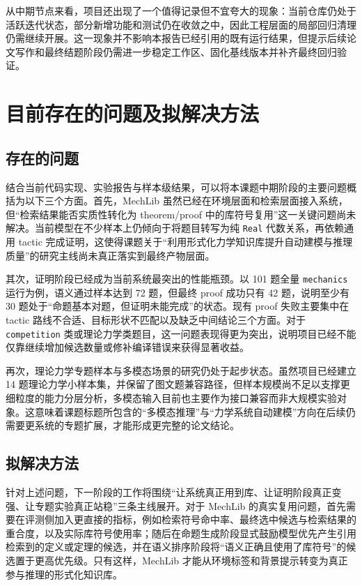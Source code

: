 \documentclass[12pt,a4paper]{ctexart}
\begin{document}
从中期节点来看，项目还出现了一个值得记录但不宜夸大的现象：当前仓库仍处于活跃迭代状态，部分新增功能和测试仍在收敛之中，因此工程层面的局部回归清理仍需继续开展。这一现象并不影响本报告已经引用的既有运行结果，但提示后续论文写作和最终结题阶段仍需进一步稳定工作区、固化基线版本并补齐最终回归验证。

\section{目前存在的问题及拟解决方法}

\subsection{存在的问题}

结合当前代码实现、实验报告与样本级结果，可以将本课题中期阶段的主要问题概括为以下三个方面。首先，MechLib 虽然已经在环境层面和检索层面接入系统，但“检索结果能否实质性转化为 theorem/proof 中的库符号复用”这一关键问题尚未解决。当前模型在不少样本上仍倾向于将题目转写为纯 \texttt{Real} 代数关系，再依赖通用 tactic 完成证明，这使得课题关于“利用形式化力学知识库提升自动建模与推理质量”的研究主线尚未真正落实到最终产物层面。

其次，证明阶段已经成为当前系统最突出的性能瓶颈。以 101 题全量 \texttt{mechanics} 运行为例，语义通过样本达到 72 题，但最终 proof 成功只有 42 题，说明至少有 30 题处于“命题基本对题，但证明未能完成”的状态。现有 proof 失败主要集中在 tactic 路线不合适、目标形状不匹配以及缺乏中间结论三个方面。对于 \texttt{competition} 类或理论力学类题目，这一问题表现得更为突出，说明项目已经不能仅靠继续增加候选数量或修补编译错误来获得显著收益。

再次，理论力学专题样本与多模态场景的研究仍处于起步状态。虽然项目已经建立 14 题理论力学小样本集，并保留了图文题兼容路径，但样本规模尚不足以支撑更细粒度的能力分层分析，多模态输入目前也主要作为接口兼容而非大规模实验对象。这意味着课题标题所包含的“多模态推理”与“力学系统自动建模”方向在后续仍需要更系统的专题扩展，才能形成更完整的论文结论。

\subsection{拟解决方法}

针对上述问题，下一阶段的工作将围绕“让系统真正用到库、让证明阶段真正变强、让专题实验真正站稳”三条主线展开。对于 MechLib 的真实复用问题，首先需要在评测侧加入更直接的指标，例如检索符号命中率、最终选中候选与检索结果的重合度，以及实际库符号使用率；随后在命题生成阶段显式鼓励模型优先产生引用检索到的定义或定理的候选，并在语义排序阶段将“语义正确且使用了库符号”的候选置于更高优先级。只有这样，MechLib 才能从环境标签和背景提示转变为真正参与推理的形式化知识库。
\end{document}
